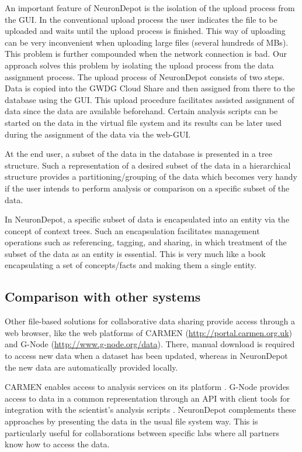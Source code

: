 \documentclass{frontiersSCNS} %
\begin{document}
An important feature of NeuronDepot is the isolation of the upload process from
the GUI. In the conventional upload process the user indicates the file to be
uploaded and waits until the upload process is finished. This way of uploading
can be very inconvenient when uploading large files (several hundreds of MBs).
This problem is further compounded when the network connection is bad. Our
approach solves this problem by isolating the upload process from the data
assignment process. The upload process of NeuronDepot consists of two steps.
Data is copied into the GWDG Cloud Share and then assigned from there to the
database using the GUI. This upload procedure facilitates assisted assignment
of data since the data are available beforehand. Certain analysis scripts can be
started on the data in the virtual file system and its results can be later
used during the assignment of the data via the web-GUI.

At the end user, a subset of the data in the database is presented in a tree
structure. Such a representation of a desired subset of the data in a hierarchical
structure provides a partitioning/grouping of the data which becomes very handy
if the user intends to perform analysis or comparison on a specific subset of
the data.

In NeuronDepot, a specific subset of data is encapsulated into an entity via
the concept of context trees. Such an encapsulation facilitates management
operations such as referencing, tagging, and sharing, in which treatment of the
subset of the data as an entity is essential. This is very much like a book
encapsulating a set of concepts/facts and making them a single entity.

\subsection{Comparison with other systems}

Other file-based solutions for collaborative data sharing provide access
through a web browser, like the web platforms of CARMEN
(\url{http://portal.carmen.org.uk}) and G-Node
(\url{http://www.g-node.org/data}). There, manual download is required to
access new data when a dataset has been updated, whereas in NeuronDepot
the new data are automatically provided locally.

CARMEN enables access to analysis services on its platform
\citep{austin_carmen:_2011}. G-Node provides access to data in a common
representation through an API \citep{Sobolev_integrated_2014} with client tools for
integration with the scientist's analysis scripts \citep{Sobolev_data_2014}.
NeuronDepot complements these approaches by presenting the data in the usual
file system way. This is particularly useful for collaborations between
specific labs where all partners know how to access the data.
\end{document}
